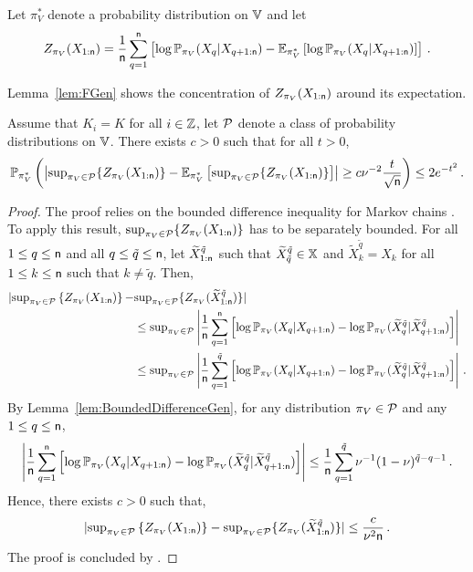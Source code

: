 \noindent
Let $\pi^*_V$ denote a probability distribution on $\mathbb{V}$ and let
\[
Z_{\pi_V}(X_{1:{\mathsf n}})=\frac1{{\mathsf n}}\sum_{q=1}^{{\mathsf n}}\left[\log \mathbb{P}_{\pi_V}(X_{q}|X_{q+1:{\mathsf n}})-\mathbb{E}_{\pi_V^*}\left[\log \mathbb{P}_{\pi_V}(X_{q}|X_{q+1:{\mathsf n}})\right]\right]\,.
\]

\noindent
Lemma~\ref{lem:FGen} shows the concentration of $Z_{\pi_V}(X_{1:{\mathsf n}})$ around its expectation.
\begin{lemma}
\label{lem:FGen}
Assume that $K_i=K$ for all $i\in\mathbb{Z}$, let $\mathcal{P}$ denote a class of probability distributions on $\mathbb{V}$. There exists $c>0$ such that for all $t>0$,
\[
\mathbb{P}_{\pi^*_V}\left(\left|\mathrm{sup}_{\pi_V\in\mathcal{P}}\{Z_{\pi_V}(X_{1:{\mathsf n}})\}-\mathbb{E}_{\pi^*_V}\left[\mathrm{sup}_{\pi_V\in\mathcal{P}}\{Z_{\pi_V}(X_{1:{\mathsf n}})\}\right]\right|\ge c\nu^{-2}\frac{t}{\sqrt{{\mathsf n}}}\right)\le 2e^{-t^2}\,.
\]
\end{lemma}
\begin{proof}
The proof relies on the bounded difference inequality for Markov chains \cite[Theorem 0.2]{dedecker:gouezel:2015}. 
%
%
To apply this result, $\mathrm{sup}_{\pi_V\in\mathcal{P}}\{Z_{\pi_V}(X_{1:{\mathsf n}})\}$ has to be separately bounded. For all $1\le q\le{\mathsf n}$ and all $q\le \tilde{q}\le {\mathsf n}$, let $\widetilde{X}^{\tilde{q}}_{1:{\mathsf n}}$ such that $\widetilde{X}_{\tilde{q}}^{\tilde{q}}\in \mathbb{X}$ and $\widetilde{X}_k^{\tilde{q}} = X_k$ for all $1\le k\le {\mathsf n}$ such that $k\neq \tilde{q}$. 
Then, 
\begin{align*}
 |\mathrm{sup}_{\pi_V\in\mathcal{P}}\left\{Z_{\pi_V}(X_{1:{\mathsf n}})\right\}-&\mathrm{sup}_{\pi_V\in\mathcal{P}}\{Z_{\pi_V}(\widetilde{X}^{\tilde{q}}_{1:{\mathsf n}})\}|\\
 &\le\mathrm{sup}_{\pi_V\in\mathcal{P}}\left|\frac1{{\mathsf n}}\sum_{q=1}^{{\mathsf n}}\left[\log \mathbb{P}_{\pi_V}(X_{q}|X_{q+1:{\mathsf n}})-\log \mathbb{P}_{\pi_V}(\widetilde{X}^{\tilde{q}}_{q}|\widetilde{X}^{\tilde{q}}_{q+1:{\mathsf n}})\right]\right|\\
 &\le\mathrm{sup}_{\pi_V\in\mathcal{P}}\left|\frac1{{\mathsf n}}\sum_{q=1}^{\tilde{q}}\left[\log \mathbb{P}_{\pi_V}(X_{q}|X_{q+1:{\mathsf n}})-\log \mathbb{P}_{\pi_V}(\widetilde{X}^{\tilde{q}}_{q}|\widetilde{X}^{\tilde{q}}_{q+1:{\mathsf n}})\right]\right|\,.
\end{align*}
By Lemma~\ref{lem:BoundedDifferenceGen}, for any distribution $\pi_V\in\mathcal{P}$ and any $1\le q\le {\mathsf n}$,
\[
\left|\frac1{{\mathsf n}}\sum_{q=1}^{{\mathsf n}}\left[\log \mathbb{P}_{\pi_V}(X_{q}|X_{q+1:{\mathsf n}})-\log \mathbb{P}_{\pi_V}(\widetilde{X}^{\tilde{q}}_{q}|\widetilde{X}^{\tilde{q}}_{q+1:{\mathsf n}})\right]\right| \leq \frac1{{\mathsf n}}\sum_{q=1}^{\tilde{q}}\nu^{-1}(1-\nu)^{\tilde{q}-q-1}\,.
\]
Hence, there exists $c>0$ such that,
\[
 |\mathrm{sup}_{\pi_V\in\mathcal{P}}\left\{Z_{\pi_V}(X_{1:{\mathsf n}})\right\}-\mathrm{sup}_{\pi_V\in\mathcal{P}}\{Z_{\pi_V}(\widetilde{X}^{\tilde{q}}_{1:{\mathsf n}})\}|\le \frac{c}{\nu^2{\mathsf n}}\,.
\]
The proof is concluded by \cite[Theorem 0.2]{dedecker:gouezel:2015}.
\end{proof}



